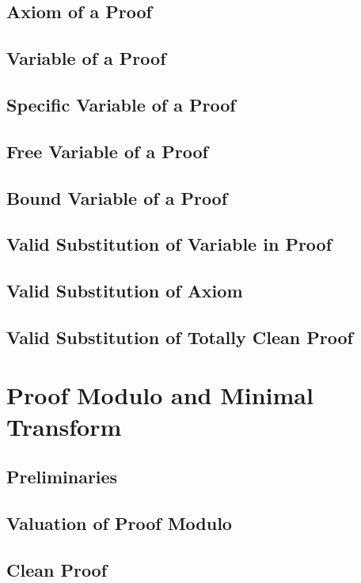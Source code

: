    \subsection{Axiom of a Proof}
      
    \subsection{Variable of a Proof}
      
    \subsection{Specific Variable of a Proof}
      
    \subsection{Free Variable of a Proof}
      
    \subsection{Bound Variable of a Proof}
      
    \subsection{Valid Substitution of Variable in Proof}
      
    \subsection{Valid Substitution of Axiom}
      
    \subsection{Valid Substitution of Totally Clean Proof}
      
\section{Proof Modulo and Minimal Transform}
    \subsection{Preliminaries}
      
    \subsection{Valuation of Proof Modulo}
      
    \subsection{Clean Proof}
      
